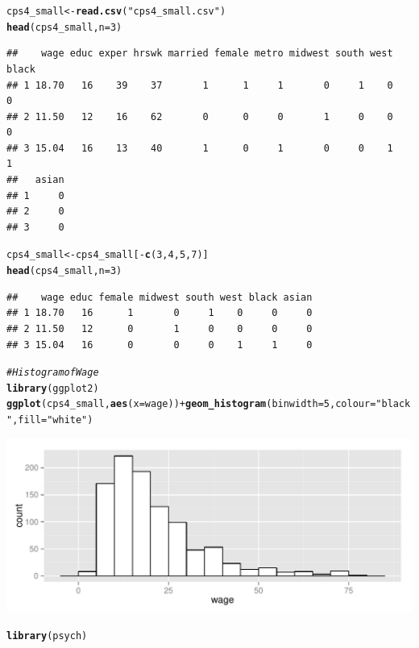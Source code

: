 \documentclass[a4paper]{article}\usepackage[]{graphicx}\usepackage[]{color}
\makeatletter
\def\maxwidth{ %
  \ifdim\Gin@nat@width>\linewidth
    \linewidth
  \else
    \Gin@nat@width
  \fi
}
\newcommand{\hlnum}[1]{\textcolor[rgb]{0.686,0.059,0.569}{#1}}%
\newcommand{\hlstr}[1]{\textcolor[rgb]{0.192,0.494,0.8}{#1}}%
\newcommand{\hlcom}[1]{\textcolor[rgb]{0.678,0.584,0.686}{\textit{#1}}}%
\newcommand{\hlopt}[1]{\textcolor[rgb]{0,0,0}{#1}}%
\newcommand{\hlstd}[1]{\textcolor[rgb]{0.345,0.345,0.345}{#1}}%
\newcommand{\hlkwb}[1]{\textcolor[rgb]{0.69,0.353,0.396}{#1}}%
\newcommand{\hlkwc}[1]{\textcolor[rgb]{0.333,0.667,0.333}{#1}}%
\newcommand{\hlkwd}[1]{\textcolor[rgb]{0.737,0.353,0.396}{\textbf{#1}}}%
\newenvironment{kframe}{%
 \def\at@end@of@kframe{}%
 \ifinner\ifhmode%
  \def\at@end@of@kframe{\end{minipage}}%
  \begin{minipage}{\columnwidth}%
 \fi\fi%
 \def\FrameCommand##1{\hskip\@totalleftmargin \hskip-\fboxsep
 \colorbox{shadecolor}{##1}\hskip-\fboxsep
     \hskip-\linewidth \hskip-\@totalleftmargin \hskip\columnwidth}%
 \MakeFramed {\advance\hsize-\width
   \@totalleftmargin\z@ \linewidth\hsize
   \@setminipage}}%
 {\par\unskip\endMakeFramed%
 \at@end@of@kframe}
\newenvironment{knitrout}{}{} %
\makeatother
\begin{document}
\begin{knitrout}
\begin{kframe}
{\ttfamily\noindent\bfseries{}}\begin{alltt}
\hlstd{cps4_small} \hlkwb{<-} \hlkwd{read.csv}\hlstd{(}\hlstr{"cps4_small.csv"}\hlstd{)}
\hlkwd{head}\hlstd{(cps4_small,}\hlkwc{n}\hlstd{=}\hlnum{3}\hlstd{)}
\end{alltt}
\begin{verbatim}
##    wage educ exper hrswk married female metro midwest south west black
## 1 18.70   16    39    37       1      1     1       0     1    0     0
## 2 11.50   12    16    62       0      0     0       1     0    0     0
## 3 15.04   16    13    40       1      0     1       0     0    1     1
##   asian
## 1     0
## 2     0
## 3     0
\end{verbatim}
\begin{alltt}
\hlstd{cps4_small} \hlkwb{<-} \hlstd{cps4_small[}\hlopt{-}\hlkwd{c}\hlstd{(}\hlnum{3}\hlstd{,}\hlnum{4}\hlstd{,}\hlnum{5}\hlstd{,}\hlnum{7}\hlstd{)]}
\hlkwd{head}\hlstd{(cps4_small,}\hlkwc{n}\hlstd{=}\hlnum{3}\hlstd{)}
\end{alltt}
\begin{verbatim}
##    wage educ female midwest south west black asian
## 1 18.70   16      1       0     1    0     0     0
## 2 11.50   12      0       1     0    0     0     0
## 3 15.04   16      0       0     0    1     1     0
\end{verbatim}
\begin{alltt}
\hlcom{# Histogram of Wage}
\hlkwd{library}\hlstd{(ggplot2)}
\hlkwd{ggplot}\hlstd{(cps4_small,} \hlkwd{aes}\hlstd{(}\hlkwc{x}\hlstd{=wage))} \hlopt{+} \hlkwd{geom_histogram}\hlstd{(}\hlkwc{binwidth}\hlstd{=}\hlnum{5}\hlstd{,} \hlkwc{colour}\hlstd{=}\hlstr{"black"}\hlstd{,} \hlkwc{fill}\hlstd{=}\hlstr{"white"}\hlstd{)}
\end{alltt}
\end{kframe}
\includegraphics[width=\maxwidth]{figure/unnamed-chunk-1-1} 
\begin{kframe}\begin{alltt}
\hlkwd{library}\hlstd{(psych)}
\end{alltt}



\end{kframe}
\end{knitrout}
\end{document}
